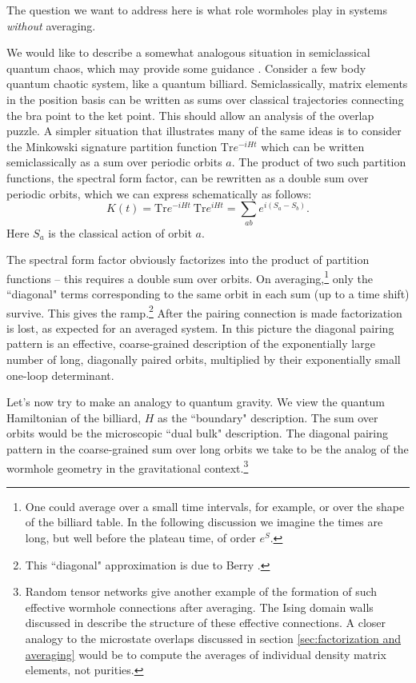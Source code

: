 \documentclass[12pt]{article}
\newcommand{\be}{\begin{equation}}
\newcommand{\ee}{\end{equation}}
\numberwithin{equation}{section}
\def\tr{\text{Tr}}
\begin{document}
The question we want to address here is what role wormholes play in systems \emph{without} averaging.

We would like to describe a somewhat analogous situation in semiclassical quantum chaos, which may provide some guidance \cite{Saad:2019lba}.   Consider a few body quantum chaotic system, like a quantum billiard.   Semiclassically, matrix elements in the position basis can be written as sums over classical trajectories connecting the bra point to the ket point.    This should allow an analysis of the overlap puzzle.      A simpler situation that illustrates  many of the  same ideas is to consider the Minkowski signature partition function $\tr e^{-iHt}$ which can be written semiclassically as a sum over periodic orbits $a$.  The product of two such partition functions, the spectral form factor, can be rewritten as  a double sum over  periodic orbits, which we can express schematically as follows:
\be
K(t) = \tr e^{-iHt} ~ \tr e^{iHt} = \sum_{ab} e^{i (S_a -S_b)} .
\ee
Here $S_a$ is the classical action of orbit $a$.  

The spectral form factor obviously factorizes into the product of partition functions --  this requires a double sum over orbits.
On averaging,\footnote{One could average over a small time intervals, for example, or over the shape of the billiard table.   In the following discussion we imagine the times are long, but well before the plateau time, of order $e^{S}$.}   only the   ``diagonal" terms corresponding to the same orbit in each sum (up to a time shift) survive. This gives the ramp.\footnote{This ``diagonal" approximation is due to Berry \cite{Berry1985SemiclassicalTO}.}   After the pairing connection is made factorization is lost, as expected for an averaged system. In this picture the diagonal pairing pattern is an effective, coarse-grained description of the exponentially large number of long,  diagonally paired orbits, multiplied by their exponentially small one-loop determinant.  

Let's now try to make an analogy to quantum gravity. We view the quantum Hamiltonian of the billiard, $H$ as the ``boundary" description.  The sum over orbits would be the microscopic  ``dual  bulk"  description. The diagonal pairing pattern in the coarse-grained sum over long orbits we take to be the analog of the wormhole geometry in the gravitational context.\footnote{Random tensor networks \cite{Hayden:2016cfa} give another example of the formation of such effective wormhole connections after averaging.   The Ising domain walls discussed in \cite{Hayden:2016cfa} describe the structure of these effective connections. A closer analogy to the microstate overlaps discussed in section \ref{sec:factorization and averaging} would be to compute the averages of individual density matrix elements, not purities.}
\end{document}
